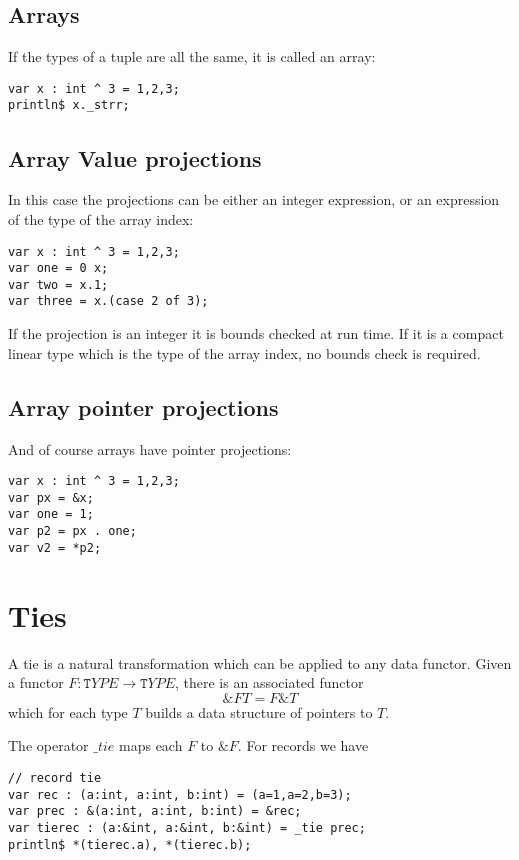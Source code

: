 \documentclass{article}
\begin{document}
\subsection{Arrays}
If the types of a tuple are all the same, it is called an array:

\begin{verbatim}
var x : int ^ 3 = 1,2,3;
println$ x._strr;
\end{verbatim}

\subsection{Array Value projections}
In this case the projections can be either an integer expression,
or an expression of the type of the array index:

\begin{verbatim}
var x : int ^ 3 = 1,2,3;
var one = 0 x;
var two = x.1;
var three = x.(case 2 of 3);
\end{verbatim}

If the projection is an integer it is bounds checked at
run time. If it is a compact linear type which is the type
of the array index, no bounds check is required.

\subsection{Array pointer projections}
And of course arrays have pointer projections:

\begin{verbatim}
var x : int ^ 3 = 1,2,3;
var px = &x;
var one = 1;
var p2 = px . one;
var v2 = *p2;
\end{verbatim}

\section{Ties}
A tie is a natural transformation which can be applied to any data functor.
Given a functor $F: {\mathtt TYPE} \rightarrow {\mathtt TYPE}$, there is an associated functor 
$$\&F T = F \&T$$
which for each type $T$ builds a data structure of pointers to $T$.

The operator $\mathrm \_tie$ maps each $F$ to $\&F$. For records we have

\begin{verbatim}
// record tie
var rec : (a:int, a:int, b:int) = (a=1,a=2,b=3);
var prec : &(a:int, a:int, b:int) = &rec;
var tierec : (a:&int, a:&int, b:&int) = _tie prec;
println$ *(tierec.a), *(tierec.b);
\end{verbatim}
\end{document}
